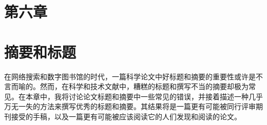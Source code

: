 \section*{第六章}
\section*{摘要和标题}
在网络搜索和数字图书馆的时代，一篇科学论文中好标题和摘要的重要性或许是不言而喻的。然而，在科学和技术文献中，糟糕的标题和撰写不当的摘要却极为常见。在本章中，我将讨论论文标题和摘要中一些常见的错误，并接着描述一种几乎万无一失的方法来撰写优秀的标题和摘要。其结果将是一篇更有可能被同行评审期刊接受的手稿，以及一篇更有可能被应该阅读它的人们发现和阅读的论文。

